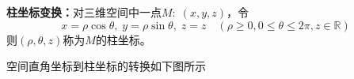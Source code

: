 \begin{thx}
	{\bf 柱坐标变换：}对三维空间中一点$M:\;(x,y,z)$，令
	$$x=\rho\cos\theta,\;y=\rho\sin\theta,\;z=z\quad (\rho\geq 0,0\leq\theta\leq
	2\pi,z\in\mathbb{R})$$
	则$(\rho,\theta,z)$称为$M$的柱坐标。
\end{thx}
空间直角坐标到柱坐标的转换如下图所示
\begin{center}
	\quad
\end{center}
